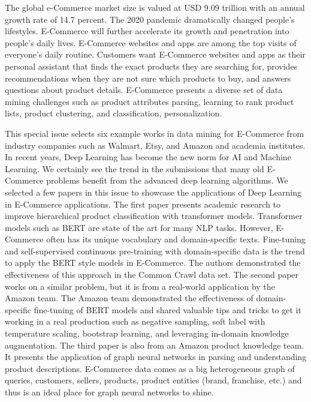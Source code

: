 \documentclass[11pt]{article}
\begin{document}
The global e-Commerce market size is valued at USD 9.09 trillion with an annual growth rate of 14.7 percent. The 2020 pandemic dramatically changed people's lifestyles. E-Commerce will further accelerate its growth and penetration into people's daily lives. E-Commerce websites and apps are among the top visits of everyone's daily routine. Customers want E-Commerce websites and apps as their personal assistant that finds the exact products they are searching for, provides recommendations when they are not sure which products to buy, and answers questions about product details. E-Commerce presents a diverse set of data mining challenges such as product attributes parsing, learning to rank product lists, product clustering, and classification, personalization.
 

This special issue selects six example works in data mining for E-Commerce from industry companies such as Walmart, Etsy, and Amazon and academia institutes. In recent years, Deep Learning has become the new norm for AI and Machine Learning. We certainly see the trend in the submissions that many old E-Commerce problems benefit from the advanced deep learning algorithms. We selected a few papers in this issue to showcase the applications of Deep Learning in E-Commerce applications. The first paper presents academic research to improve hierarchical product classification with transformer models. Transformer models such as BERT are state of the art for many NLP tasks. However, E-Commerce often has its unique vocabulary and domain-specific texts. Fine-tuning and self-supervised continuous pre-training with domain-specific data is the trend to apply the BERT style models in E-Commerce. The authors demonstrated the effectiveness of this approach in the Common Crawl data set. The second paper works on a similar problem, but it is from a real-world application by the Amazon team. The Amazon team demonstrated the effectiveness of domain-specific fine-tuning of BERT models and shared valuable tips and tricks to get it working in a real production such as negative sampling, soft label with temperature scaling, bootstrap learning, and leveraging in-domain knowledge augmentation. The third paper is also from an Amazon product knowledge team. It presents the application of graph neural networks in parsing and understanding product descriptions. E-Commerce data comes as a big heterogeneous graph of queries, customers, sellers, products, product entities (brand, franchise, etc.) and thus is an ideal place for graph neural networks to shine. 
\end{document}
